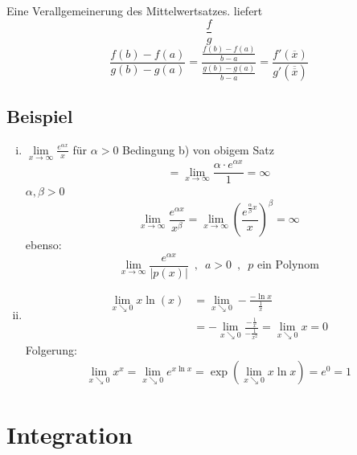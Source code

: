 Eine Verallgemeinerung des Mittelwertsatzes. liefert
\[
	\frac{f}{g} 
\]
\[
	\frac{f(b)-f(a)}{g(b)- g(a)} = \frac{\frac{f(b)-f(a)}{b-a} }{\frac{g(b)-g(a)}{b-a} } = \frac{f'(\overline{x})}{g'(\overline{\overline{x}} )}  
\]

\subsection{Beispiel} %
\label{sub:beispiel}
\begin{enumerate}[(i)]
	\item $\lim\limits_{x \to \infty} \frac{e^{\alpha x}}{x} $ für $\alpha >0$ Bedingung b) von obigem Satz
	\[
		= \lim\limits_{x \to \infty} \frac{\alpha \cdot e^{\alpha x}}{1} = \infty 
	\]
	$\alpha, \beta > 0$
	\[
		\lim\limits_{x \to \infty} \frac{e^{\alpha x}}{x^\beta} = \lim\limits_{x \to \infty} \left( \frac{e^{\frac{\alpha}{\beta}x }}{x} \right)^\beta
		= \infty
	\]
	ebenso:
	\[
		\lim\limits_{x \to \infty} \frac{e^{\alpha x}}{|p(x)|} \enspace ,\enspace a > 0 \enspace , \enspace p \text{ ein Polynom}
	\]
	\item 
	\begin{align*}
		\lim\limits_{x \searrow 0} x \ln(x) &= \lim\limits_{x \searrow 0} - \frac{-\ln x}{\frac{1}{x} } \\
		&= - \lim\limits_{x \searrow 0} \frac{- \frac{1}{x} }{- \frac{1}{x^2} } =  \lim\limits_{x \searrow 0} x = 0 
	\end{align*}
	Folgerung:
	\begin{align*}
		 \lim\limits_{x \searrow 0} x^x =  \lim\limits_{x \searrow 0} e^{x \ln x} = \exp \left( \lim\limits_{x \searrow 0} x \ln x \right) = e^0 = 1
	\end{align*}
\end{enumerate}

\section{Integration} %
\label{sec:integration}

